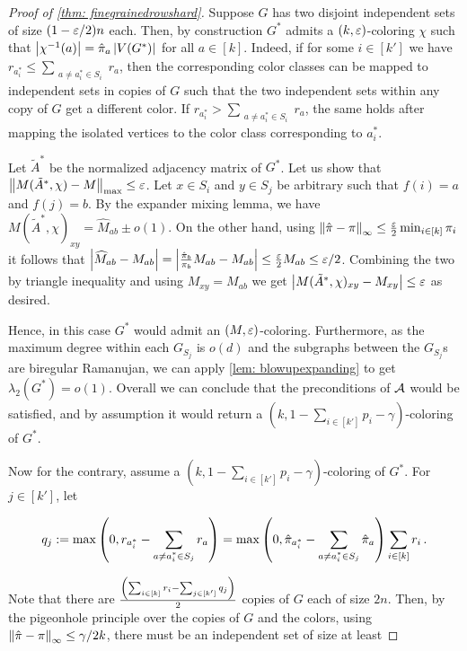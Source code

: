 \begin{proof}[Proof of \cref{thm: finegrainedrowshard}]
    Suppose $G$ has two disjoint independent sets of size $(1-\varepsilon/2)n$ each. Then, by construction $G^*$ admits a $(k, \varepsilon)$-coloring $\chi$ such that $\left\lvert\chi^{-1}(a)\right\rvert=\hat{\pi}_a \left\lvert V(G^*)\right\rvert$ for all $a\in[k]$. Indeed, if for some $i\in[k']$ we have $r_{a_i^*} \leq \sum_{\substack{a \neq a_i^{*} \in S_i}} r_a$, then the corresponding color classes can be mapped to independent sets in copies of $G$ such that the two independent sets within any copy of $G$ get a different color. If $r_{a_i^*} > \sum_{\substack{a \neq a_i^{*} \in S_i}} r_a$, the same holds after mapping the isolated vertices to the color class corresponding to $a_i^*$.
    
    Let $\tilde{A}^*$ be the normalized adjacency matrix of $G^*$. Let us show that $\left\lVert M(\tilde{A}^*, \allowbreak\chi)-M\right\rVert_{\max}\leq \varepsilon$. Let $x\in S_i$ and $y\in S_j$ be arbitrary such that $f(i)=a$ and $f(j)=b$. By the expander mixing lemma,  we have $M(\tilde{A}^*, \chi)_{xy}=\widehat{M}_{ab}\pm o(1)$. On the other hand, using $\left\lVert\hat{\pi} - \pi\right\rVert_{\infty}\leq \frac{\varepsilon}{2} \min_{i\in [k]}\pi_i$ it follows that $\left\lvert\widehat{M}_{ab}-M_{ab}\right\rvert=\left\lvert\frac{\hat{\pi}_b}{\pi_b}M_{ab} - M_{ab}\right\rvert\leq \frac{\varepsilon}{2} M_{ab}\leq \varepsilon/2$. Combining the two by triangle inequality and using $M_{xy}=M_{ab}$ we get $\left\lvert M(\tilde{A}^*, \chi)_{xy}-M_{xy}\right\rvert\leq \varepsilon$ as desired.

    Hence, in this case $G^*$ would admit an $(M, \varepsilon)$-coloring. Furthermore, as the maximum degree within each $G_{S_j}$ is $o(d)$ and the subgraphs between the $G_{S_j}$s are biregular Ramanujan, we can apply \cref{lem: blowupexpanding} to get $\lambda_2(G^*)=o(1)$. Overall we can conclude that the preconditions of $\mathcal{A}$ would be satisfied, and by assumption it would return a $(k, 1 - \sum_{i \in [k']} p_i - \gamma)$-coloring of $G^*$.

    Now for the contrary, assume a $(k, 1 - \sum_{i \in [k']} p_i - \gamma)$-coloring of $G^*$. For $j\in[k']$, let
    
    $$q_j:=\max\left(0, r_{a_i^*} - \sum_{\substack{a \neq a_i^{*} \in S_j}} r_a\right)=\max\left(0, \hat{\pi}_{a_i^*} - \sum_{\substack{a \neq a_i^{*} \in S_j}} \hat{\pi}_a\right) \sum_{i\in[k]} r_i\,.$$
    
    Note that there are $\frac{\left(\sum_{i\in[k]} r_i-\sum_{j\in[k']} q_j\right)}{2}$ copies of $G$ each of size $2n$. Then, by the pigeonhole principle over the copies of $G$ and the colors, using $\left\lVert\hat{\pi} - \pi\right\rVert_{\infty}\leq \gamma/2k$, there must be an independent set of size at least 
    

\end{proof}
